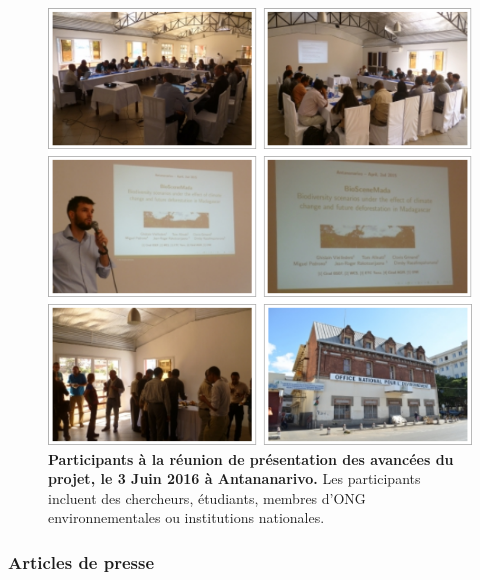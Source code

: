 \documentclass[12pt,]{article}
\begin{document}
\begin{figure}[H]

{\centering \includegraphics[width=\textwidth]{figures/Meeting} 

}

\caption{\textbf{Participants à la réunion de présentation des
avancées du projet, le 3 Juin 2016 à Antananarivo.} Les participants
incluent des chercheurs, étudiants, membres d'ONG environnementales ou
institutions nationales.}\label{fig:meeting}
\end{figure}

\hypertarget{articles-de-presse}{%
\subsubsection{Articles de presse}\label{articles-de-presse}}
\end{document}
